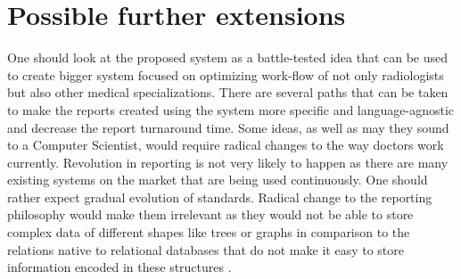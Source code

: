 \documentclass[12pt, twoside, openany]{report}
\theoremstyle{definition}
\begin{document}

\section{Possible further extensions}
One should look at the proposed system as a battle-tested idea that can be used to create bigger system focused on optimizing work-flow of not only radiologists but also other medical specializations. There are several paths that can be taken to make the reports created using the system more specific and language-agnostic and decrease the report turnaround time. Some ideas, as well as may they sound to a Computer Scientist, would require radical changes to the way doctors work currently. Revolution in reporting is not very likely to happen as there are many existing systems on the market that are being used continuously. One should rather expect gradual evolution of standards. Radical change to the reporting philosophy would make them irrelevant as they would not be able to store complex data of different shapes like trees or graphs in comparison to the relations native to relational databases that do not make it easy to store information encoded in these structures \cite{coelko-trees}. 
\end{document}
